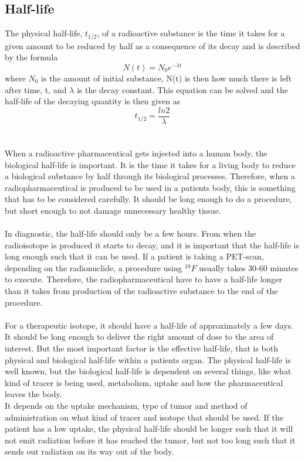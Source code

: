 \documentclass[twoside,english]{uiofysmaster/uiofysmaster}
\begin{document}
\subsection{Half-life}
The physical half-life, $t_{1/2}$, of a radioactive substance is the time it takes for a given amount to be reduced by half as a consequence of its decay and is described by the formula $$N(t) = N_0e^{-\lambda t} $$ 
where $N_0$ is the amount of initial substance, N(t) is then how much there is left after time, t, and $\lambda$ is the decay constant. This equation can be solved and the half-life of the decaying quantity is then given as $$t_{1/2} = \frac{ln2}{\lambda}$$ \\
\\
When a radioactive pharmaceutical gets injected into a human body, the biological half-life is important. It is the time it takes for a living body to reduce a biological substance by half through its biological processes. Therefore, when a radiopharmaceutical is produced to be used in a patients body, this is something that has to be considered carefully. It should be long enough to do a procedure, but short enough to not damage unnecessary healthy tissue. \\
\\
In diagnostic, the half-life should only be a few hours. From when the radioisotope is produced it starts to decay, and it is important that the half-life is long enough such that it can be used. If a patient is taking a PET-scan, depending on the radionuclide, a procedure using $^{18}F$ usually takes 30-60 minutes to execute. Therefore, the radiopharmaceutical have to have a half-life longer than it takes from production of the radioactive substance to the end of the procedure.
\\
\\
For a therapeutic isotope, it should have a half-life of approximately a few days. It should be long enough to deliver the right amount of dose to the area of interest. But the most important factor is the effective half-life, that is both physical and biological half-life within a patients organ\cite{Yeong}. The physical half-life is well known, but the biological half-life is dependent on several things, like what kind of tracer is being used, metabolism, uptake and how the pharmaceutical leaves the body\cite{Yeong}.\\
It depends on the uptake mechanism, type of tumor and method of administration\cite{Yeong} on what kind of tracer and isotope that should be used. If the patient has a low uptake, the physical half-life should be longer such that it will not emit radiation before it has reached the tumor, but not too long such that it sends out radiation on its way out of the body. 
\end{document}
